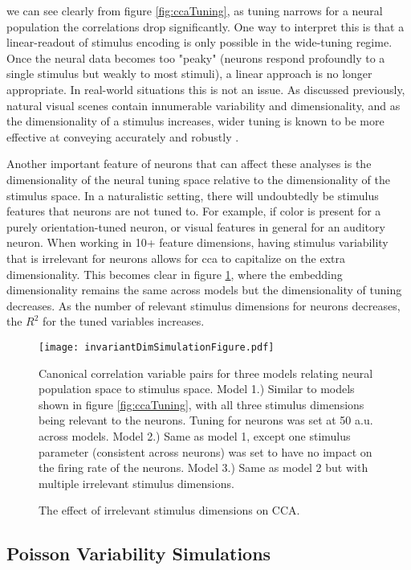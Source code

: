 we can see clearly from figure \ref{fig:ccaTuning}, as tuning narrows for a neural population the correlations drop significantly. One way to interpret this is that a linear-readout of stimulus encoding is only possible in the wide-tuning regime. Once the neural data becomes too "peaky" (neurons respond profoundly to a single stimulus but weakly to most stimuli), a linear approach is no longer appropriate. In real-world situations this is not an issue. As discussed previously, natural visual scenes contain innumerable variability and dimensionality, and as the dimensionality of a stimulus increases, wider tuning is known to be more effective at conveying accurately and robustly \parencite{Brown2006}.

Another important feature of neurons that can affect these analyses is the dimensionality of the neural tuning space relative to the dimensionality of the stimulus space. In a naturalistic setting, there will undoubtedly be stimulus features that neurons are not tuned to. For example, if color is present for a purely orientation-tuned neuron, or visual features in general for an auditory neuron. When working in 10+ feature dimensions, having stimulus variability that is irrelevant for neurons allows for \gls{cca} to capitalize on the extra dimensionality. This becomes clear in figure \ref{fig:ccaInvarDim}, where the embedding dimensionality remains the same across models but the dimensionality of tuning decreases. As the number of relevant stimulus dimensions for neurons decreases, the $R^2$ for the tuned variables increases.

\begin{figure}
	\centering
	\texttt{[image: invariantDimSimulationFigure.pdf]}
	\caption{The effect of irrelevant stimulus dimensions on CCA.}{Canonical correlation variable pairs for three models relating neural population space to stimulus space. Model 1.) Similar to models shown in figure \ref{fig:ccaTuning}, with all three stimulus dimensions being relevant to the neurons. Tuning for neurons was set at 50 a.u. across models. Model 2.) Same as model 1, except one stimulus parameter (consistent across neurons) was set to have no impact on the firing rate of the neurons. Model 3.) Same as model 2 but with multiple irrelevant stimulus dimensions.}
	\label{fig:ccaInvarDim}
\end{figure}


\subsection{Poisson Variability Simulations}

